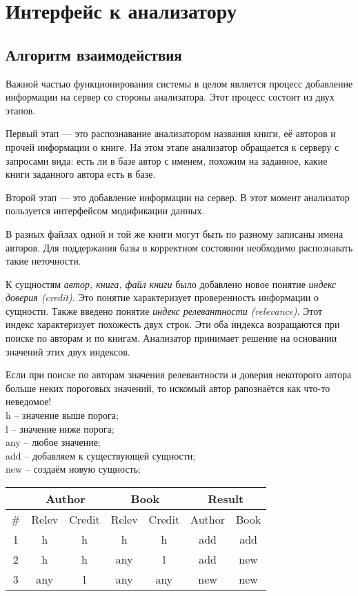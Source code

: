 \section{Интерфейс к анализатору}


\subsection{Алгоритм взаимодействия}

Важной частью функционирования системы в целом является процесс добавление информации на сервер со стороны анализатора. Этот процесс состоит из двух этапов. 

Первый этап --- это распознавание анализатором названия книги, её авторов и прочей информации о книге. На этом этапе анализатор обращается к серверу с запросами вида: есть ли в базе автор с именем, похожим на заданное, какие книги заданного автора есть в базе.

Второй этап --- это добавление информации на сервер. В этот момент анализатор пользуется интерфейсом модификации данных.


В разных файлах одной и той же книги могут быть по разному записаны имена авторов. Для поддержания базы в корректном состоянии необходимо распознавать такие неточности.

К сущностям {\em автор, книга, файл книги} было добавлено новое понятие {\em индекс доверия (credit)}. Это понятие характеризует проверенность информации о сущности.
Также введено понятие {\em индекс релевантности (relevance)}. Этот индекс характеризует похожесть двух строк.
Эти оба индекса возращаются при поиске по авторам и по книгам.
Анализатор принимает решение на основании значений этих двух индексов.

Если при поиске по авторам значения релевантности и доверия некоторого автора
больше неких пороговых значений,
то искомый автор рапознаётся как что-то неведомое! \\
h -- значение выше порога;\\
l -- значение ниже порога;\\
any -- любое значение;\\
add -- добавляем к существующей сущности; \\
new -- создаём новую сущность;\\

  \begin{tabular}{ | c | c | c | c | c || c | c |}
  \hline
   & \multicolumn{2}{c|}{Author} & \multicolumn{2}{c||}{Book} & \multicolumn{2}{c|}{Result} \\
    \hline
      \# & Relev & Credit & Relev & Credit & Author & Book \\ \hline
      1 & h   & h   & h   & h   & add & add \\ \hline
      2 & h   & h   & any & l   & add & new \\ \hline
      3 & any & l   & any & any & new & new \\
    \hline
  \end{tabular}


